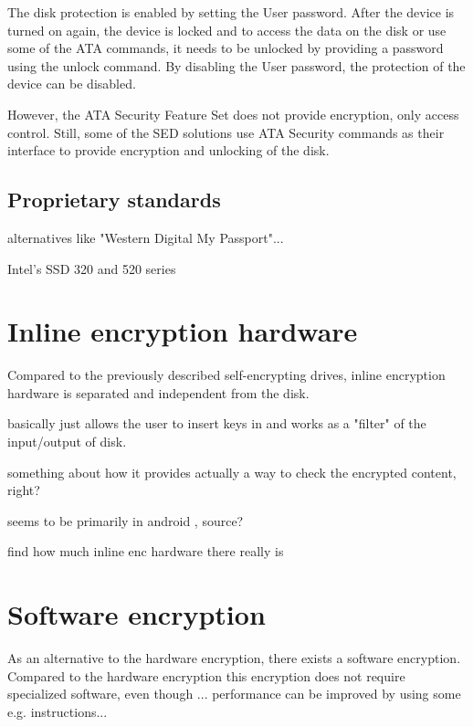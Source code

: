 The disk protection is enabled by setting the User password. After the device is turned on again, the device is locked and to access the data on the disk or use some of the ATA commands, it needs to be unlocked by providing a password using the unlock command. By disabling the User password, the protection of the device can be disabled.

However, the ATA Security Feature Set does not provide encryption, only access control.
Still, some of the SED solutions use ATA Security commands as their interface to provide encryption and unlocking of the disk.


\subsection{Proprietary standards}



alternatives like "Western Digital My Passport"...

Intel’s SSD 320 and 520 series

\section{Inline encryption hardware}

Compared to the previously described self-encrypting drives, inline encryption hardware is separated and independent from the disk. 

basically just allows the user to insert keys in and works as a "filter" of the input/output of disk.

something about how it provides actually a way to check the encrypted content, right?

seems to be primarily in android , source?

find how much inline enc hardware there really is 

\section{Software encryption}

As an alternative to the hardware encryption, there exists a software encryption. Compared to the hardware encryption this encryption does not require specialized software, even though ... performance can be improved by using some e.g. instructions...

